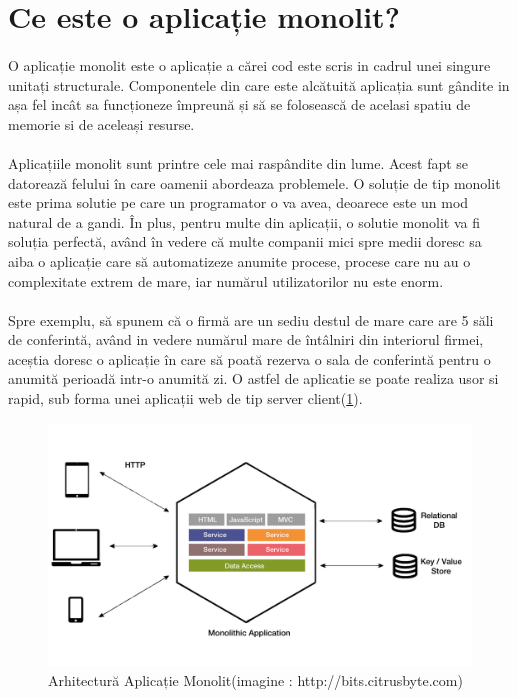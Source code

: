 \documentclass[12pt]{report}
\begin{document}
  	\section{Ce este o aplicație monolit?}
  	\paragraph{}O aplicație monolit este o aplicație a cărei cod este scris in cadrul unei singure unitați structurale. Componentele din care este alcătuită aplicația sunt gândite in așa fel incât sa funcționeze împreună și să se folosească de acelasi spatiu de memorie si de aceleași resurse.
  	\paragraph{}Aplicațiile monolit sunt printre cele mai raspândite din lume. Acest fapt se datorează felului în care oamenii abordeaza problemele. O soluție de tip monolit este prima solutie pe care un programator o va avea, deoarece este un mod natural de a gandi. În plus, pentru multe din aplicații, o solutie monolit va fi soluția perfectă, având în vedere că multe companii mici spre medii doresc sa aiba o aplicație care să automatizeze anumite procese, procese care nu au o complexitate extrem de mare, iar numărul utilizatorilor nu este enorm. 
  	\paragraph{}Spre exemplu, să spunem că o firmă are un sediu destul de mare care are 5 săli de conferintă, având in vedere numărul mare de întâlniri din interiorul firmei, aceștia doresc o aplicație în care să poată rezerva o sala de conferintă pentru o anumită perioadă intr-o anumită zi. O astfel de aplicatie se poate realiza usor si rapid, sub forma unei aplicații web de tip server client(\ref{monolithicArhitecture}).
  	\begin{figure}[h]
  	\centering
  	\includegraphics[scale=.2]{monolitFigure}
	\caption{Arhitectură Aplicație Monolit(imagine : http://bits.citrusbyte.com)}  
	\label{monolithicArhitecture}
  	\end{figure}
\end{document}

